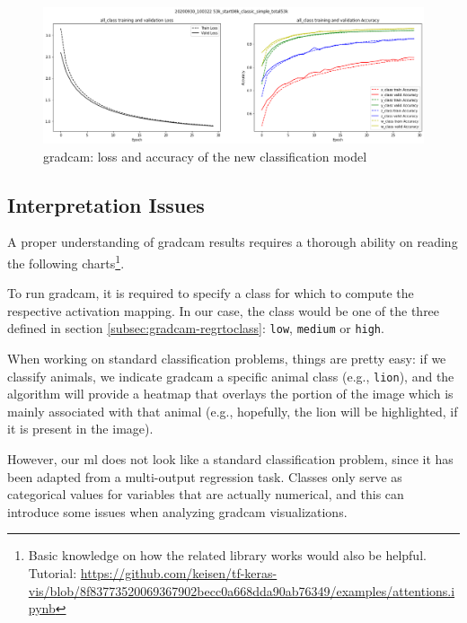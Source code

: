 \begin{figure}[!h]
	\centering
	\includegraphics[width=1\textwidth]{"contents/images/04-metrics-class-simple"}
	\caption[\gls{gradcam}: loss and accuracy of the new classification model]{\gls{gradcam}: loss and accuracy of the new classification model}
	\label{fig:gradcam-retrain-simple}
\end{figure}



\subsection{Interpretation Issues}
\label{subsec:gradcam-reading}

A proper understanding of \gls{gradcam} results requires a thorough ability on reading the following charts\footnote{Basic knowledge on how the related library works would also be helpful. Tutorial: \url{https://github.com/keisen/tf-keras-vis/blob/8f83773520069367902becc0a668dda90ab76349/examples/attentions.ipynb}}.
 
\medskip

To run \gls{gradcam}, it is required to specify a class for which to compute the respective activation mapping. In our case, the class would be one of the three defined in section \ref{subsec:gradcam-regrtoclass}: \texttt{low}, \texttt{medium} or \texttt{high}. 

When working on standard classification problems, things are pretty easy: if we classify animals, we indicate \gls{gradcam} a specific animal class (e.g., \texttt{lion}), and the algorithm will provide a heatmap that overlays the portion of the image which is mainly associated with that animal (e.g., hopefully, the lion will be highlighted, if it is present in the image).

However, our \gls{ml} does not look like a standard classification problem, since it has been adapted from a multi-output regression task. Classes only serve as categorical values for variables that are actually numerical, and this can introduce some issues when analyzing \gls{gradcam} visualizations.

